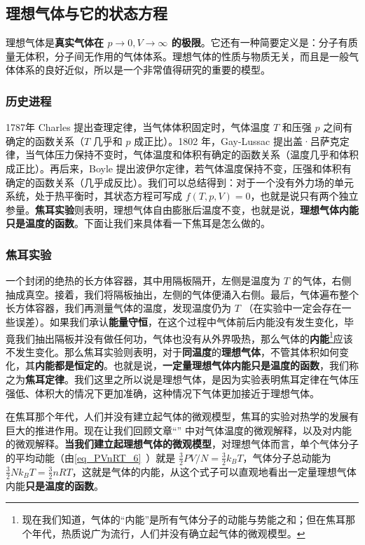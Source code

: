 

\subsection{理想气体与它的状态方程}

理想气体是\textbf{真实气体在 $p\rightarrow 0,V\rightarrow \infty$ 的极限}。它还有一种简要定义是：分子有质量无体积，分子间无作用的气体体系。理想气体的性质与物质无关，而且是一般气体体系的良好近似，所以是一个非常值得研究的重要的模型。
\subsubsection{历史进程}
1787年 Charles 提出查理定律，当气体体积固定时，气体温度 $T$ 和压强 $p$ 之间有确定的函数关系（$T$ 几乎和 $p$ 成正比）。1802 年，Gay-Lussac 提出盖·吕萨克定律，当气体压力保持不变时，气体温度和体积有确定的函数关系（温度几乎和体积成正比）。再后来，Boyle 提出波伊尔定律，若气体温度保持不变，压强和体积有确定的函数关系（几乎成反比）。我们可以总结得到：对于一个没有外力场的单元系统，处于热平衡时，其状态方程可写成 $f(T,p,V)=0$，也就是说只有两个独立参量。\textbf{焦耳实验}则表明，理想气体自由膨胀后温度不变，也就是说，\textbf{理想气体内能只是温度的函数}。下面让我们来具体看一下焦耳是怎么做的。
\subsubsection{焦耳实验}
一个封闭的绝热的长方体容器，其中用隔板隔开，左侧是温度为 $T$ 的气体，右侧抽成真空。接着，我们将隔板抽出，左侧的气体便涌入右侧。最后，气体遍布整个长方体容器，我们再测量气体的温度，发现温度仍为 $T$ （在实验中一定会存在一些误差）。如果我们承认\textbf{能量守恒}，在这个过程中气体前后内能没有发生变化，毕竟我们抽出隔板并没有做任何功，气体也没有从外界吸热，那么气体的\textbf{内能}\footnote{现在我们知道，气体的“内能”是所有气体分子的动能与势能之和；但在焦耳那个年代，热质说广为流行，人们并没有确立起气体的微观模型。}应该不发生变化。那么焦耳实验则表明，对于\textbf{同温度}的\textbf{理想气体}，不管其体积如何变化，其\textbf{内能都是恒定的}。也就是说，\textbf{一定量理想气体内能只是温度的函数}，我们称之为\textbf{焦耳定律}。我们这里之所以说是理想气体，是因为实验表明焦耳定律在气体压强低、体积大的情况下更加准确，这种情况下气体更加接近于理想气体。

在焦耳那个年代，人们并没有建立起气体的微观模型，焦耳的实验对热学的发展有巨大的推进作用。现在让我们回顾文章“” 中对气体温度的微观解释，以及对内能的微观解释。\textbf{当我们建立起理想气体的微观模型}，对理想气体而言，单个气体分子的平均动能（由\autoref{eq_PVnRT_6}~）就是 $\frac{3}{2}PV/N = \frac{3}{2}k_B T$，气体分子总动能为 $\frac{3}{2}N k_B T=\frac{3}{2}nRT$，这就是气体的内能，从这个式子可以直观地看出一定量理想气体内能\textbf{只是温度的函数}。


